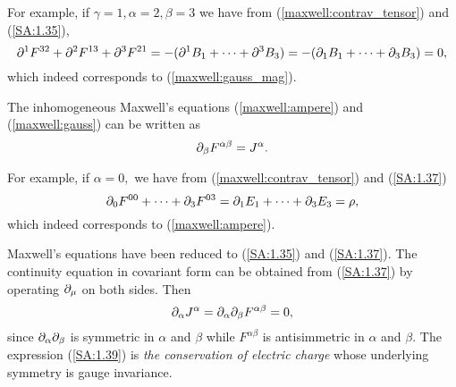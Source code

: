For example, if $\gamma=1, \alpha=2, \beta=3$ we have from (\ref{maxwell:contrav_tensor}) and (\ref{SA:1.35}), 
\begin{equation}
\label{SA:1.36}
\partial^{1}F^{32}+\partial^{2}F^{13}+\partial^{3}F^{21}= -(\partial^{1}B_{1}+\dots +\partial^{3}B_{3})
=-(\partial_{1}B_{1}+\dots +\partial_{3}B_{3})=0,
\end{equation}
which indeed corresponds to (\ref{maxwell:gauss_mag}).

The inhomogeneous Maxwell's equations (\ref{maxwell:ampere}) and (\ref{maxwell:gauss}) can be written as 
\begin{equation}
\label{SA:1.37}
\partial_{\beta} F^{\alpha \beta}=J^{\alpha}.
\end{equation}

For example, if $\alpha=0,$ we have from (\ref{maxwell:contrav_tensor}) and (\ref{SA:1.37})
\begin{equation}
\label{SA:1.38}
\partial_{0}F^{00}+\dots +\partial_{3}F^{03}=\partial_{1}E_{1}+\dots +\partial_{3}E_{3}= \rho , 
\end{equation}
which indeed corresponds to (\ref{maxwell:ampere}).

\begin{rem}
Maxwell's equations have been reduced to (\ref{SA:1.35}) and (\ref{SA:1.37}). The continuity equation in covariant form can be obtained from (\ref{SA:1.37}) by operating $\partial_{\mu}$ on both sides. Then 
\begin{equation}
\label{SA:1.39}
\partial_{\alpha}J^{\alpha}=\partial_{\alpha} \partial_{\beta} F^{\alpha \beta}=0,
\end{equation} 
since $\partial_{\alpha} \partial_{\beta}$ is symmetric in $\alpha$ and $\beta$ while $F^{\alpha \beta}$ is antisimmetric in  $\alpha$ and $\beta.$ The expression (\ref{SA:1.39}) is \emph{the conservation of electric charge} whose underlying symmetry is gauge invariance.
\end{rem}